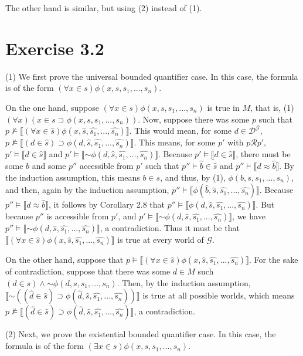 \documentclass{article}
\newcommand*{\oldneg}{\mathord{\sim}}
\newcommand{\lbc}{\llbracket}
\newcommand{\rbc}{\rrbracket}
\theoremstyle{definition}
\begin{document}
The other hand is similar, but using (2) instead of (1).

\section*{Exercise 3.2}
(1) We first prove the universal bounded quantifier case. In this case, the formula is of the form 
$(\forall x\in s)\phi(x,s,s_1,...,s_n)$.

On the one hand, suppose $(\forall x\in s)\phi(x,s,s_1,...,s_n)$ is true in $M$, that is,
(1) $(\forall x)(x\in s\supset\phi(x,s,s_1,...,s_n))$. Now, suppose there was some $p$ such that 
$p\nvDash\lbc(\forall x\in\hat{s})\phi(x,\hat{s},\hat{s_1},...,\hat{s_n})\rbc$. This would mean, for some 
$d\in\mathcal{D}^\mathcal{G}$, $p\nvDash\lbc (d\in\hat{s})\supset\phi(d,\hat{s},\hat{s_1},...,\hat{s_n})\rbc$. This means,
for some $p'$ with $p\mathcal{R}p'$, $p'\vDash\lbc d\in\hat{s}\rbc$ and $p'\vDash\lbc\oldneg\phi(d,\hat{s},\hat{s_1},...,\hat{s_n})\rbc$. 
Because $p'\vDash\lbc d\in\hat{s}\rbc$, there must be some $b$ and some $p''$ accessible from $p'$ such that 
$p''\vDash\hat{b}\in\hat{s}$ and $p''\vDash\lbc d\approx\hat{b}\rbc$. By the induction assumption, this means
$b\in s$, and thus, by (1), $\phi(b,s,s_1,...,s_n)$, and then, again by the induction assumption,
$p''\vDash\lbc\phi(\hat{b},\hat{s},\hat{s_1},...,\hat{s_n})\rbc$. Because 
$p''\vDash\lbc d\approx\hat{b}\rbc$, it follows by Corollary 2.8 that 
$p''\vDash\lbc\phi(d,\hat{s},\hat{s_1},...,\hat{s_n})\rbc$. But because $p''$ is accessible from
$p'$, and $p'\vDash\lbc\oldneg\phi(d,\hat{s},\hat{s_1},...,\hat{s_n})\rbc$, we have 
$p''\vDash\lbc\oldneg\phi(d,\hat{s},\hat{s_1},...,\hat{s_n})\rbc$, a contradiction. Thus it must be that 
$\lbc(\forall x\in\hat{s})\phi(x,\hat{s},\hat{s_1},...,\hat{s_n})\rbc$ is true at every world of $\mathcal{G}$.

On the other hand, suppose that $p\vDash\lbc(\forall x\in\hat{s})\phi(x,\hat{s},\hat{s_1},...,\hat{s_n})\rbc$.
For the sake of contradiction, suppose that there was some $d\in M$ such 
$(d\in s)\wedge\oldneg\phi(d,s,s_1,...,s_n)$. Then, by the induction assumption,
$\lbc\oldneg((\hat{d}\in\hat{s})\supset\phi(\hat{d},\hat{s},\hat{s_1},...,\hat{s_n}))\rbc$
is true at all possible worlds, which means $p\nvDash\lbc(\hat{d}\in\hat{s})\supset\phi(\hat{d},\hat{s},\hat{s_1},...,\hat{s_n})\rbc$, 
a contradiction.

(2) Next, we prove the existential bounded quantifier case. In this case, the formula is of the form
$(\exists x\in s)\phi(x,s,s_1,...,s_n)$.
\end{document}
